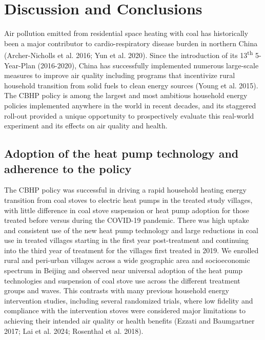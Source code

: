 \documentclass[
  letterpaper,
  DIV=11,
  numbers=noendperiod]{scrartcl}
\begin{document}
\section{Discussion and Conclusions}\label{discussion-and-conclusions}

Air pollution emitted from residential space heating with coal has
historically been a major contributor to cardio-respiratory disease
burden in northern China (Archer-Nicholls et al. 2016; Yun et al. 2020).
Since the introduction of its 13\textsuperscript{th} 5-Year-Plan
(2016-2020), China has successfully implemented numerous large-scale
measures to improve air quality including programs that incentivize
rural household transition from solid fuels to clean energy sources
(Young et al. 2015). The CBHP policy is among the largest and most
ambitious household energy policies implemented anywhere in the world in
recent decades, and its staggered roll-out provided a unique opportunity
to prospectively evaluate this real-world experiment and its effects on
air quality and health.

\subsection{Adoption of the heat pump technology and adherence to the
policy}\label{adoption-of-the-heat-pump-technology-and-adherence-to-the-policy}

The CBHP policy was successful in driving a rapid household heating
energy transition from coal stoves to electric heat pumps in the treated
study villages, with little difference in coal stove suspension or heat
pump adoption for those treated before versus during the COVID-19
pandemic. There was high uptake and consistent use of the new heat pump
technology and large reductions in coal use in treated villages starting
in the first year post-treatment and continuing into the third year of
treatment for the villages first treated in 2019. We enrolled rural and
peri-urban villages across a wide geographic area and socioeconomic
spectrum in Beijing and observed near universal adoption of the heat
pump technologies and suspension of coal stove use across the different
treatment groups and waves. This contrasts with many previous household
energy intervention studies, including several randomized trials, where
low fidelity and compliance with the intervention stoves were considered
major limitations to achieving their intended air quality or health
benefits (Ezzati and Baumgartner 2017; Lai et al. 2024; Rosenthal et al.
2018).
\end{document}
